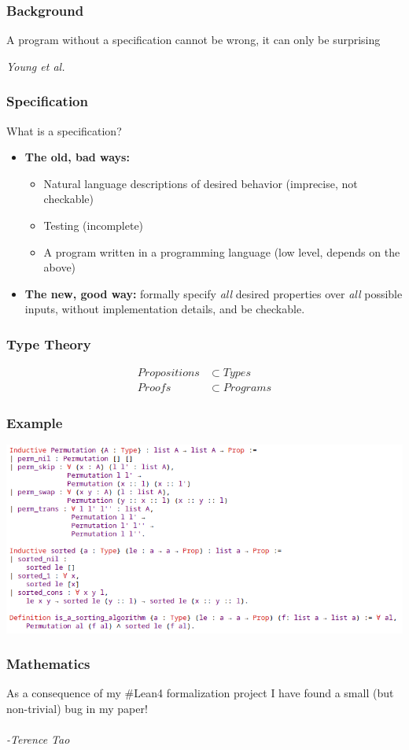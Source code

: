 \documentclass[usenames,dvipsnames]{beamer}
\begin{document}
\begin{frame}[fragile]
\frametitle{Background}
\epigraph{A program without a specification cannot be wrong, it can only be
surprising}{\textit{Young et al.}}
\end{frame}

\begin{frame}
\frametitle{Specification}
What is a specification?
\\
\begin{itemize}[<+->]
\item \textbf{The old, bad ways:} 
\begin{itemize}[<+->]
  \item Natural language descriptions of desired behavior (imprecise, not
  checkable)
  \item Testing (incomplete)
  \item A program written in a programming language (low level, depends on the
  above)
\end{itemize}
\item \textbf{The new, good way:} formally specify \emph{all} desired properties over
\emph{all} possible inputs, without implementation details, and be checkable.
\end{itemize}
\end{frame}

\begin{frame}
\frametitle{Type Theory}
\begin{align*}
Propositions &\subset Types \\ 
Proofs &\subset Programs
\end{align*}
\end{frame}

\begin{frame}
\frametitle{Example}
\includegraphics[width=0.9\paperwidth]{sort}
\end{frame}

\begin{frame}
\frametitle{Mathematics}
As a consequence of my \#Lean4 formalization project I have found a small (but non-trivial) bug in my paper! 
\\
\hspace{1em}
\\
\textit{-Terence Tao\supercite{tao}}
\end{frame}
\end{document}
